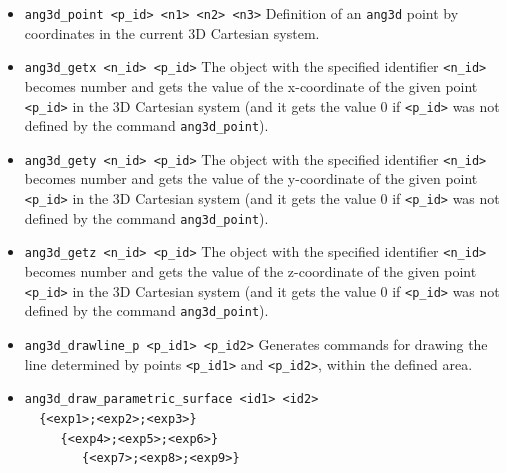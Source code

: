 \documentclass[a4paper]{book}
\begin{document}
\begin{itemize}
\item
\verb|ang3d_point <p_id> <n1> <n2> <n3>|
        Definition of an \verb|ang3d| point by coordinates in the current
        3D Cartesian system.

\item
\verb|ang3d_getx <n_id> <p_id>|
        The object with the specified identifier \verb|<n_id>| becomes
        {\sc number} and gets the value of the x-coordinate of the
        given point \verb|<p_id>| in the 3D Cartesian system (and it gets
        the value 0 if \verb|<p_id>| was not defined by the command
        \verb|ang3d_point|).


\item
\verb|ang3d_gety <n_id> <p_id>|
        The object with the specified identifier \verb|<n_id>| becomes
        {\sc number} and gets the value of the y-coordinate of the
        given point \verb|<p_id>| in the 3D Cartesian system (and it gets
        the value 0 if \verb|<p_id>| was not defined by the command
        \verb|ang3d_point|).


\item
\verb|ang3d_getz <n_id> <p_id>|
        The object with the specified identifier \verb|<n_id>| becomes
        {\sc number} and gets the value of the z-coordinate of the given
        point \verb|<p_id>| in the 3D Cartesian system (and it gets the
        value 0 if \verb|<p_id>| was not defined by the command
        \verb|ang3d_point|).



\item
\verb|ang3d_drawline_p <p_id1> <p_id2>|
        Generates commands for drawing the line determined by
        points \verb|<p_id1>| and \verb|<p_id2>|,
        within the defined area.

\item
\verb|ang3d_draw_parametric_surface <id1> <id2>| \\
\verb|  {<exp1>;<exp2>;<exp3>}| \\
\verb|     {<exp4>;<exp5>;<exp6>}| \\
\verb|        {<exp7>;<exp8>;<exp9>}|


\end{itemize}
\end{document}

